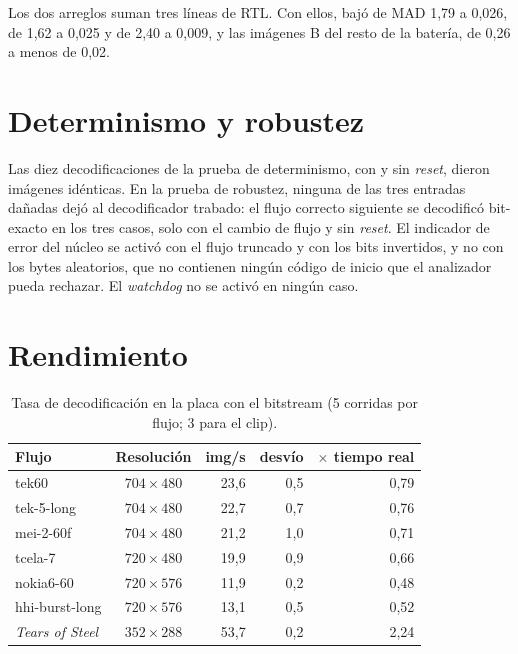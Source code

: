 Los dos arreglos suman tres líneas de RTL. Con ellos,  bajó
de MAD 1,79 a 0,026,  de 1,62 a 0,025 y  de
2,40 a 0,009, y las imágenes B del resto de la batería, de 0,26 a menos de
0,02.

\section{Determinismo y robustez}

Las diez decodificaciones de la prueba de determinismo, con y sin
\emph{reset}, dieron imágenes idénticas. En la prueba de robustez, ninguna de
las tres entradas dañadas dejó al decodificador trabado: el flujo correcto
siguiente se decodificó bit-exacto en los tres casos, solo con el cambio de
flujo y sin \emph{reset}. El indicador de error del núcleo se activó con el
flujo truncado y con los bits invertidos, y no con los bytes aleatorios, que
no contienen ningún código de inicio que el analizador pueda rechazar. El
\emph{watchdog} no se activó en ningún caso.

\section{Rendimiento}
\label{sec:res-rendimiento}

\begin{table}[ht]
  \centering\small
  \begin{tabular}{@{}l c r r r@{}}
    \toprule
    \textbf{Flujo} & \textbf{Resolución} & \textbf{img/s} & \textbf{desvío} & \textbf{$\times$ tiempo real} \\
    \midrule
    tek60          & $704 \times 480$ & 23,6 & 0,5 & 0,79 \\
    tek-5-long     & $704 \times 480$ & 22,7 & 0,7 & 0,76 \\
    mei-2-60f      & $704 \times 480$ & 21,2 & 1,0 & 0,71 \\
    tcela-7        & $720 \times 480$ & 19,9 & 0,9 & 0,66 \\
    nokia6-60      & $720 \times 576$ & 11,9 & 0,2 & 0,48 \\
    hhi-burst-long & $720 \times 576$ & 13,1 & 0,5 & 0,52 \\
    \midrule
    \emph{Tears of Steel} & $352 \times 288$ & 53,7 & 0,2 & 2,24 \\
    \bottomrule
  \end{tabular}
  \caption{Tasa de decodificación en la placa con el bitstream
     (5 corridas por flujo; 3 para el clip).}
  \label{tab:rendimiento}
\end{table}

